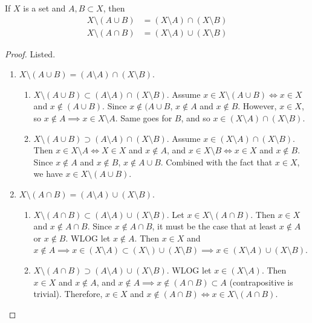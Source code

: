   \begin{theorem}
		\label{thm:demorgan}
    If $X$ is a set and $A, B \subset X$, then 
    \begin{align}
      X \setminus (A \cup B) & = (X \setminus A) \cap (X \setminus B) \\
      X \setminus (A \cap B) & = (X \setminus A) \cup (X \setminus B)
    \end{align}
  \end{theorem}
  \begin{proof}
    Listed. 
    \begin{enumerate}
      \item $X \setminus (A \cup B) = (A \setminus A) \cap (X \setminus B)$.
        \begin{enumerate}
          \item $X \setminus (A \cup B) \subset (A \setminus A) \cap (X \setminus B)$. Assume $x \in X \setminus (A \cup B) \iff x \in X$ and $x \not\in (A \cup B)$. Since $x \not\in (A \cup B$, $x \not\in A$ and $x \not\in B$. However, $x \in X$, so $x \not\in A \implies x \in X \setminus A$. Same goes for $B$, and so $x \in (X \setminus A) \cap (X \setminus B)$. 

          \item $X \setminus (A \cup B) \supset (A \setminus A) \cap (X \setminus B)$. Assume $x \in (X \setminus A) \cap (X \setminus B)$. Then $x \in X \setminus A \iff X \in X$ and $x \not\in A$, and $x \in X \setminus B \iff x \in X$ and $x \not\in B$. Since $x \not\in A$ and $x \not\in B$, $x \not\in A \cup B$. Combined with the fact that $x \in X$, we have $x \in X \setminus (A \cup B)$. 
        \end{enumerate}

      \item $X \setminus (A \cap B) = (A \setminus A) \cup (X \setminus B)$.
        \begin{enumerate}
          \item $X \setminus (A \cap B) \subset (A \setminus A) \cup (X \setminus B)$. Let $x \in X \setminus (A \cap B)$. Then $x \in X$ and $x \not\in A \cap B$. Since $x \not\in A \cap B$, it must be the case that at least $x \not\in A$ or $x \not\in B$. WLOG let $x \not\in A$. Then $x \in X$ and $x \not\in A \implies x \in (X \setminus A) \subset (X \setminus) \cup (X \setminus B) \implies x \in (X \setminus A) \cup (X \setminus B)$. 

          \item $X \setminus (A \cap B) \supset (A \setminus A) \cup (X \setminus B)$. WLOG let $x \in (X \setminus A)$. Then $x \in X$ and $x \not\in A$, and $x \not\in A \implies x \not\in (A \cap B) \subset A$ (contrapositive is trivial). Therefore, $x \in X$ and $x \not\in (A \cap B) \iff  x \in X \setminus (A \cap B)$. 
        \end{enumerate}
    \end{enumerate}
  \end{proof} 

